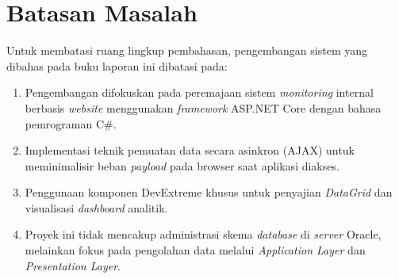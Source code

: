 \section{Batasan Masalah}
\label{sec:batasanmasalah}

Untuk membatasi ruang lingkup pembahasan, pengembangan sistem yang dibahas pada buku laporan ini dibatasi pada:
\begin{enumerate}
    \item Pengembangan difokuskan pada peremajaan sistem \emph{monitoring} internal berbasis \emph{website} menggunakan \emph{framework} ASP.NET Core dengan bahasa pemrograman C\#.
    \item Implementasi teknik pemuatan data secara asinkron (AJAX) untuk meminimalisir beban \emph{payload} pada browser saat aplikasi diakses.
    \item Penggunaan komponen DevExtreme khusus untuk penyajian \emph{DataGrid} dan visualisasi \emph{dashboard} analitik.
    \item Proyek ini tidak mencakup administrasi skema \emph{database} di \emph{server} Oracle, melainkan fokus pada pengolahan data melalui \emph{Application Layer} dan \emph{Presentation Layer}.
\end{enumerate}